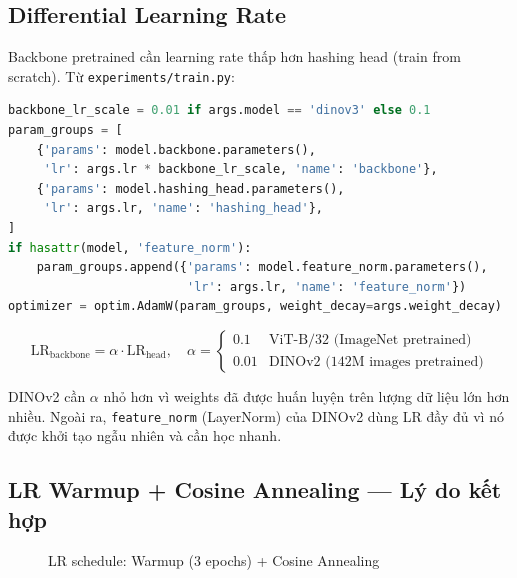 \documentclass[13pt,a4paper]{article}
\begin{document}
\subsection{Differential Learning Rate}

Backbone pretrained cần learning rate thấp hơn hashing head (train from scratch). Từ \texttt{experiments/train.py}:

\begin{lstlisting}[language=Python, caption={Differential LR implementation}]
backbone_lr_scale = 0.01 if args.model == 'dinov3' else 0.1
param_groups = [
    {'params': model.backbone.parameters(),
     'lr': args.lr * backbone_lr_scale, 'name': 'backbone'},
    {'params': model.hashing_head.parameters(),
     'lr': args.lr, 'name': 'hashing_head'},
]
if hasattr(model, 'feature_norm'):
    param_groups.append({'params': model.feature_norm.parameters(),
                         'lr': args.lr, 'name': 'feature_norm'})
optimizer = optim.AdamW(param_groups, weight_decay=args.weight_decay)
\end{lstlisting}

\begin{equation}
\text{LR}_{\text{backbone}} = \alpha \cdot \text{LR}_{\text{head}}, \quad
\alpha = \begin{cases}
0.1  & \text{ViT-B/32 (ImageNet pretrained)} \\
0.01 & \text{DINOv2 (142M images pretrained)}
\end{cases}
\end{equation}

DINOv2 cần $\alpha$ nhỏ hơn vì weights đã được huấn luyện trên lượng dữ liệu lớn hơn nhiều. Ngoài ra, \texttt{feature\_norm} (LayerNorm) của DINOv2 dùng LR đầy đủ vì nó được khởi tạo ngẫu nhiên và cần học nhanh.


\subsection{LR Warmup + Cosine Annealing --- Lý do kết hợp}

\begin{figure}[H]
\centering
{}
\caption{LR schedule: Warmup (3 epochs) + Cosine Annealing}
\label{fig:lr_schedule}
\end{figure}
\end{document}
